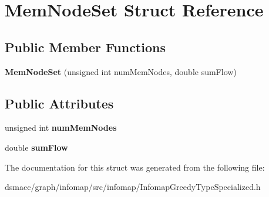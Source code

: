 \hypertarget{structMemNodeSet}{}\section{Mem\+Node\+Set Struct Reference}
\label{structMemNodeSet}
\subsection*{Public Member Functions}
\begin{DoxyCompactItemize}
\item 
\mbox{\label{structMemNodeSet_a1fb45705b58c31998b6bac36e7e67327}} 
{\bfseries Mem\+Node\+Set} (unsigned int num\+Mem\+Nodes, double sum\+Flow)
\end{DoxyCompactItemize}
\subsection*{Public Attributes}
\begin{DoxyCompactItemize}
\item 
\mbox{\label{structMemNodeSet_a5f518316341aca10c75d1e0834ecd55f}} 
unsigned int {\bfseries num\+Mem\+Nodes}
\item 
\mbox{\label{structMemNodeSet_a497f0568865a235c1997f2a9bf88eb4a}} 
double {\bfseries sum\+Flow}
\end{DoxyCompactItemize}


The documentation for this struct was generated from the following file\+:\begin{DoxyCompactItemize}
\item 
dsmacc/graph/infomap/src/infomap/Infomap\+Greedy\+Type\+Specialized.\+h\end{DoxyCompactItemize}
